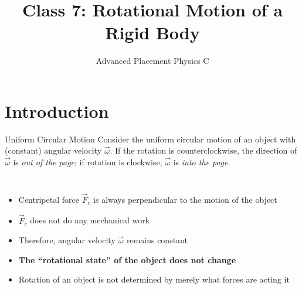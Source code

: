\documentclass[12pt,compress,aspectratio=169]{beamer}
\title{Class 7: Rotational Motion of a Rigid Body}
\subtitle{Advanced Placement Physics C}
\begin{document}
\begin{frame}
  \maketitle
\end{frame}


\section{Introduction}

\begin{frame}{Uniform Circular Motion}
  Consider the uniform circular motion of an object with (constant)
  angular velocity $\vec\omega$. If the rotation is
    counterclockwise, the direction of $\vec\omega$ is \emph{out of the page};
    if rotation is clockwise, $\vec\omega$ is \emph{into the page}.
  \begin{columns}
    \centering

    \begin{itemize}
    \item Centripetal force $\vec F_c$ is always perpendicular to the
      motion of the object
    \item $\vec F_c$ does not do any mechanical work
    \item Therefore, angular velocity $\vec\omega$ remains constant
    \item\textbf{The ``rotational state'' of the object does not change}
    \item Rotation of an object is not determined by merely what forces are
      acting it
    \end{itemize}
  \end{columns}
\end{frame}
\end{document}
